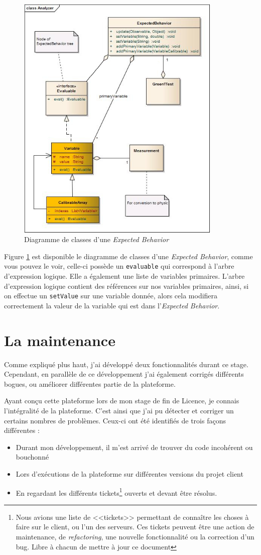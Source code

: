 \begin{figure}[H]
\centering
\includegraphics[width=9.8cm]{contents/images/eb.jpg}
\caption{Diagramme de classes d'une \textit{Expected Behavior}}
\label{fig:ebClasses}
\end{figure}
Figure \ref{fig:ebClasses} est disponible le diagramme de classes d'une \textit{Expected Behavior}, comme vous pouvez le voir, celle-ci possède un \texttt{evaluable} qui correspond à l'arbre d'expression logique. Elle a également une liste de variables primaires. L'arbre d'expression logique contient des références sur nos variables primaires, ainsi, si on effectue un \texttt{setValue} sur une variable donnée, alors cela modifiera correctement la valeur de la variable qui est dans l'\textit{Expected Behavior}.
\section{La maintenance}
Comme expliqué plus haut, j'ai développé deux fonctionnalités durant ce stage. Cependant, en parallèle de ce développement j'ai également corrigés différents bogues, ou améliorer différentes partie de la plateforme.

Ayant conçu cette plateforme lors de mon stage de fin de Licence, je connais l'intégralité de la plateforme. C'est ainsi que j'ai pu détecter et corriger un certains nombres de problèmes. Ceux-ci ont été identifiés de trois façons différentes : 
\begin{itemize}
	\item Durant mon développement, il m'est arrivé de trouver du code incohérent ou bouchonné
	\item Lors d'exécutions de la plateforme sur différentes versions du projet client
	\item En regardant les différents tickets\footnote{Nous avions une liste de <<tickets>> permettant de connaître les choses à faire sur le client, ou l'un des serveurs. Ces tickets peuvent être une action de maintenance, de \textit{refactoring}, une nouvelle fonctionnalité ou la correction d'un bug. Libre à chacun de mettre à jour ce document} ouverts et devant être résolus.
\end{itemize}

